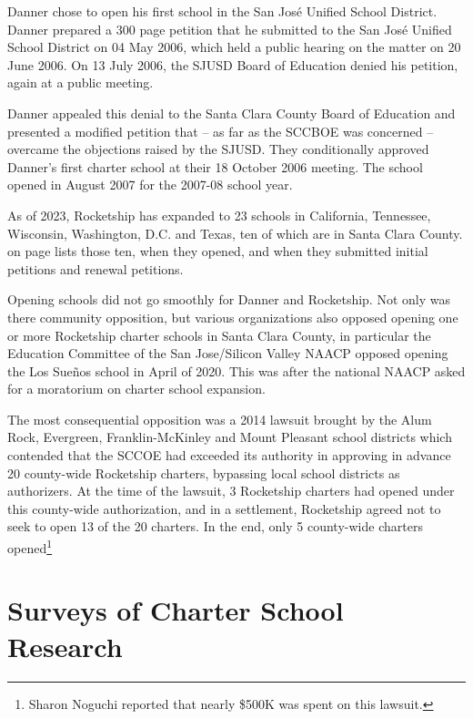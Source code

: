 Danner chose to open his first school in the San José Unified School District. Danner prepared a 300 page petition that he submitted to the San José Unified School District on 04 May 2006, which held a public hearing on the matter on 20 June 2006. On 13 July 2006, the SJUSD Board of Education denied his petition, again at a public meeting.

Danner appealed this denial to the Santa Clara County Board of Education and presented a modified petition that – as far as the SCCBOE was concerned – overcame the objections raised by the SJUSD. They conditionally approved Danner's first charter school at their 18 October 2006 meeting. The school opened in August 2007 for the 2007-08 school year.

As of 2023, Rocketship has expanded to 23 schools in California, Tennessee, Wisconsin, Washington, D.C. and Texas, ten of which are in Santa Clara County.  on page \pageref{tab:RocketshipSchools} lists those ten, when they opened, and when they submitted initial petitions and renewal petitions.

Opening schools did not go smoothly for Danner and Rocketship. Not only was there community opposition, but various organizations also opposed opening one or more Rocketship charter schools in Santa Clara County, in particular the Education Committee of the San Jose/Silicon Valley NAACP opposed opening the Los Sueños school in April of 2020\parencite{MooreII.Marachi2020}. This was after the national NAACP asked for a moratorium on charter school expansion. 

The most consequential opposition was a 2014 lawsuit brought by the Alum Rock, Evergreen, Franklin-McKinley and Mount Pleasant school districts which contended that the SCCOE had exceeded its authority in approving in advance 20 county-wide Rocketship charters, bypassing local school districts as authorizers. At the time of the lawsuit, 3 Rocketship charters had opened under this county-wide authorization, and in a settlement, Rocketship agreed not to seek to open 13 of the 20 charters. In the end, only 5 county-wide charters opened\footnote{Sharon Noguchi reported that nearly \$500K was spent on this lawsuit\parencite{Noguchi2015}.}

\section{Surveys of Charter School Research}\label{sec:charter-surveys}\indent


